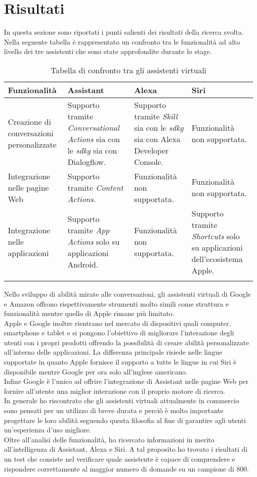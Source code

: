 \section{Risultati}
In questa sezione sono riportati i punti salienti dei risultati della ricerca svolta. Nella seguente tabella è rappresentato un confronto tra le funzionalità ad alto livello dei tre assistenti che sono state approfondite durante lo stage.
	\begin{longtable}{|p{2.5cm}|p{3cm}|p{3cm}|p{3cm}|}
		\hline
		\textbf{Funzionalità} & \textbf{Assistant} & \textbf{Alexa} & \textbf{Siri} \\\hline
		
		Creazione di conversazioni personalizzate & Supporto tramite \emph{Conversational Actions} sia con le \emph{\gls{sdkg}} sia con Dialogflow.  & Supporto tramite \emph{Skill} sia con le \emph{\gls{sdkg}} sia con Alexa Developer Console. & Funzionalità non supportata. \\
		\hline
		Integrazione nelle pagine Web & Supporto tramite \emph{Content Actions}. & Funzionalità non supportata. & Funzionalità non supportata. \\
		\hline
		Integrazione nelle applicazioni & Supporto tramite \emph{App Actions} solo su applicazioni Android. & Funzionalità non supportata. & Supporto tramite \emph{Shortcuts} solo su applicazioni dell'ecosistema Apple. \\
		\hline
		\caption{Tabella di confronto tra gli assistenti virtuali}
	\end{longtable}
Nello sviluppo di abilità mirate alle conversazioni, gli assistenti virtuali di Google e Amazon offrono rispettivamente strumenti molto simili come struttura e funzionalità mentre quello di Apple rimane più limitato. \\
Apple e Google inoltre rientrano nel mercato di dispositivi quali computer, smartphone e tablet e si pongono l'obiettivo di migliorare l’interazione degli utenti con i propri prodotti offrendo la possibilità di creare abilità personalizzate all'interno delle applicazioni. La differenza principale risiede nelle lingue supportate in quanto Apple fornisce il supporto a tutte le lingue in cui Siri è disponibile mentre Google per ora solo all'inglese americano. \\
Infine Google è l'unico ad offrire l'integrazione di Assistant nelle pagine Web per fornire all'utente una miglior interazione con il proprio motore di ricerca. \\
In generale ho riscontrato che gli assistenti virtuali attualmente in commercio sono pensati per un utilizzo di breve durata e perciò è molto importante progettare le loro abilità seguendo questa filosofia al fine di garantire agli utenti un'esperienza d'uso migliore. \\
Oltre all'analisi delle funzionalità, ho ricercato informazioni in merito all'intelligenza di Assistant, Alexa e Siri. A tal proposito ho trovato i risultati di un test che consiste nel verificare quale assistente è capace di comprendere e rispondere correttamente al maggior numero di domande su un campione di 800.
\pagebreak

